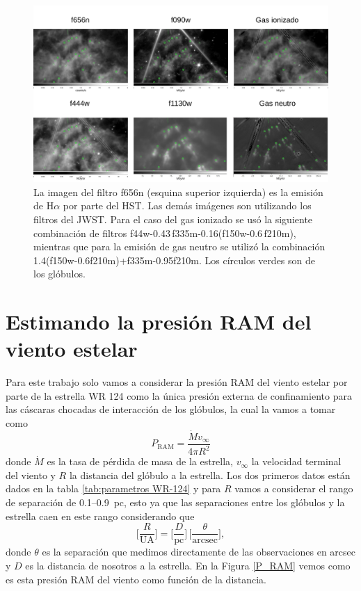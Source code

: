 \documentclass{book}
\begin{document}
\begin{figure}[htb]
    \centering
    \includegraphics[width=\textwidth]{Nuevas imagenes finales/filtros.pdf}
    \caption{La imagen del filtro f656n (esquina superior izquierda) es la emisión de H$\alpha$ por parte del HST. Las demás imágenes son utilizando los filtros del JWST. Para el caso del gas ionizado se usó la siguiente combinación de filtros f44w-0.43\,f335m-0.16(f150w-0.6\,f210m), mientras que para la emisión de gas neutro se utilizó la combinación 1.4(f150w-0.6\;f210m)+f335m-0.95\;f210m. Los círculos verdes son de los glóbulos.}
    \label{fig:filters WR124}
\end{figure}

\section{Estimando la presión RAM del viento estelar}

Para este trabajo solo vamos a considerar la presión RAM del viento estelar por parte de la estrella WR 124 como la única presión externa de confinamiento para las cáscaras chocadas de interacción de los glóbulos, la cual la vamos a tomar como \begin{equation}
 P_\mathrm{RAM}= \frac{\dot{M}v_\infty}{4\pi R^2}    
\end{equation}
donde $\dot{M}$ es la tasa de pérdida de masa de la estrella, $v_\infty$ la velocidad terminal del viento y $R$ la distancia del glóbulo a la estrella. Los dos primeros datos están dados en la tabla \ref{tab:parametros WR-124} y para $R$ vamos a considerar el rango de separación de 0.1--\SI{0.9}{pc}, esto ya que las separaciones entre los glóbulos y la estrella caen en este rango considerando que
\begin{equation}
    \Big[\frac{R}{\mathrm{UA}}\Big] = \Big[\frac{D}{\mathrm{pc}}\Big]\,\Big[\frac{\theta}{\mathrm{arcsec}}\Big],
\end{equation}
donde $\theta$ es la separación que medimos directamente de las observaciones en arcsec y $D$ es la distancia de nosotros a la estrella. En la Figura \ref{P_RAM} vemos como es esta presión RAM del viento como función de la distancia.
\end{document}
